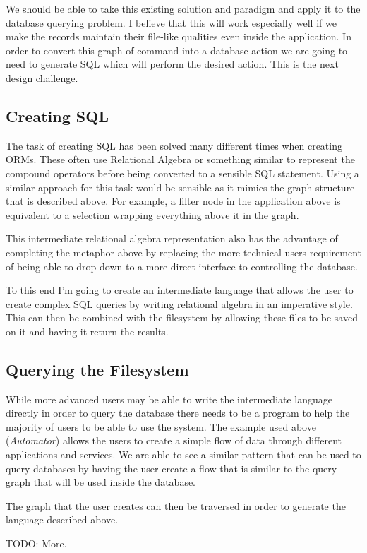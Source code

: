 We should be able to take this existing solution and paradigm and apply it to
the database querying problem. I believe that this will work especially well if
we make the records maintain their file-like qualities even inside the
application. In order to convert this graph of command into a database action
we are going to need to generate \ac{SQL} which will perform the desired
action. This is the next design challenge.

\subsection{Creating SQL}

The task of creating \ac{SQL} has been solved many different times when
creating \acp{ORM}. These often use Relational Algebra or something similar to
represent the compound operators before being converted to a sensible SQL
statement. Using a similar approach for this task would be sensible as it
mimics the graph structure that is described above. For example, a filter node
in the application above is equivalent to a selection wrapping everything above
it in the graph.

This intermediate relational algebra representation also has the advantage of
completing the metaphor above by replacing the more technical users requirement
of being able to drop down to a more direct interface to controlling the
database.

To this end I'm going to create an intermediate language that allows the user
to create complex \ac{SQL} queries by writing relational algebra in an
imperative style. This can then be combined with the filesystem by allowing
these files to be saved on it and having it return the results.

\subsection{Querying the Filesystem}

While more advanced users may be able to write the intermediate language
directly in order to query the database there needs to be a program to help
the majority of users to be able to use the system. The example used above
(\emph{Automator}) allows the users to create a simple flow of data through
different applications and services. We are able to see a similar pattern that
can be used to query databases by having the user create a flow that is
similar to the query graph that will be used inside the database.

The graph that the user creates can then be traversed in order to generate
the language described above.

TODO: More.
